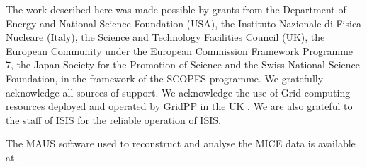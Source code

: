 The work described here was made possible by grants from the Department of Energy and National Science Foundation (USA), the Instituto Nazionale di Fisica Nucleare (Italy), 
the Science and Technology Facilities Council (UK), the European Community under the European Commission Framework Programme 7, the Japan Society for the Promotion of 
Science and the Swiss National Science Foundation, in the framework of the SCOPES programme. We gratefully acknowledge all sources of support.
We acknowledge the use of Grid computing resources deployed and operated by GridPP in the UK \cite{grid_pp_2009}. We are also grateful to the staff of ISIS for the reliable operation of ISIS.

The MAUS software used to reconstruct and analyse the MICE data is available at~\cite{MICE_code}.
